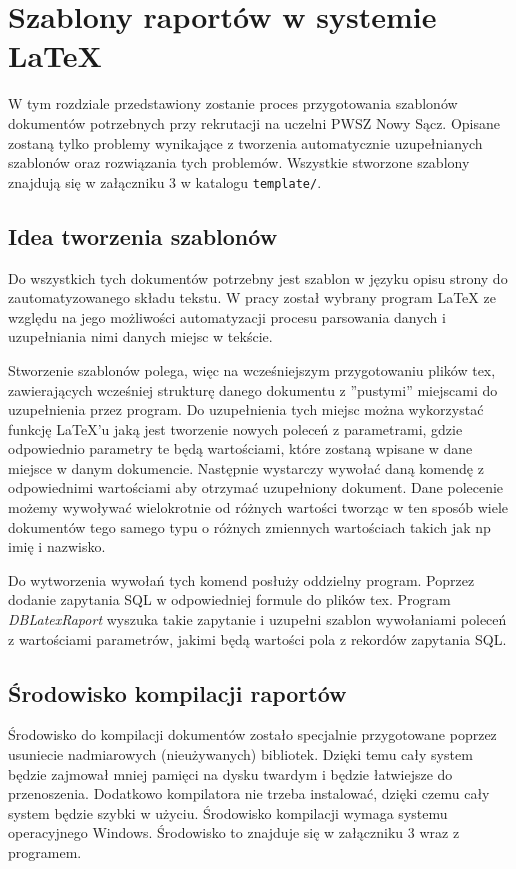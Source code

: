 \chapter{Szablony raportów w systemie LaTeX}
\label{ch:szablonyraportowwsystemielatex}

W tym rozdziale przedstawiony zostanie proces przygotowania szablonów dokumentów potrzebnych przy rekrutacji na uczelni PWSZ Nowy Sącz. Opisane zostaną tylko problemy wynikające z tworzenia automatycznie uzupełnianych szablonów oraz rozwiązania tych problemów. Wszystkie stworzone szablony znajdują się w załączniku 3 w katalogu \texttt{template/}.

\section{Idea tworzenia szablonów}

Do wszystkich tych dokumentów potrzebny jest szablon w języku opisu strony do zautomatyzowanego składu tekstu. W pracy został wybrany program LaTeX ze względu na jego możliwości automatyzacji procesu parsowania danych i uzupełniania nimi danych miejsc w tekście.

Stworzenie szablonów polega, więc na wcześniejszym przygotowaniu plików tex, zawierających wcześniej strukturę danego dokumentu z ''pustymi''  miejscami do uzupełnienia przez program. Do uzupełnienia tych miejsc można wykorzystać funkcję LaTeX'u jaką jest tworzenie nowych poleceń z parametrami, gdzie odpowiednio parametry te będą wartościami, które zostaną wpisane w dane miejsce w danym dokumencie. Następnie wystarczy wywołać daną komendę z odpowiednimi wartościami aby otrzymać uzupełniony dokument. Dane polecenie możemy wywoływać wielokrotnie od różnych wartości tworząc w ten sposób wiele dokumentów tego samego typu o różnych zmiennych wartościach takich jak np imię i nazwisko. 

 Do wytworzenia wywołań tych komend posłuży oddzielny program. Poprzez dodanie zapytania SQL w odpowiedniej formule do plików tex. Program \emph{DBLatexRaport} wyszuka takie zapytanie i uzupełni szablon wywołaniami poleceń z wartościami parametrów, jakimi będą wartości pola z rekordów zapytania SQL. 

\section{Środowisko kompilacji raportów}

Środowisko do kompilacji dokumentów zostało specjalnie przygotowane poprzez usuniecie nadmiarowych (nieużywanych) bibliotek. Dzięki temu cały system będzie zajmował mniej pamięci na dysku twardym i będzie łatwiejsze do przenoszenia. Dodatkowo kompilatora nie trzeba instalować, dzięki czemu cały system będzie szybki w użyciu. Środowisko kompilacji wymaga systemu operacyjnego Windows. Środowisko to znajduje się w załączniku 3 wraz z programem.


